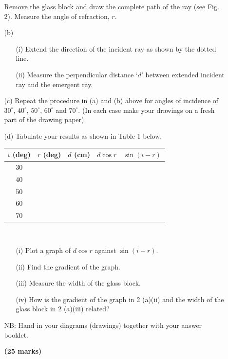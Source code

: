 \begin{enumerate}
\begin{enumerate}
Remove the glass block and draw the complete path of the ray (see Fig. 2). Measure the angle of refraction, $r$.
\item[(b)]
\begin{enumerate}
\item[(i)] Extend the direction of the incident ray as shown by the dotted line.
\item[(ii)] Measure the perpendicular distance `$d$' between extended incident ray and the emergent ray.
\end{enumerate}
\item[(c)] Repeat the procedure in (a) and (b) above for angles of incidence of $30^\circ$, $40^\circ$, $50^\circ$, $60^\circ$ and $70^\circ$. (In each case make your drawings on a fresh part of the drawing paper).
\item[(d)] Tabulate your results as shown in Table 1 below.
\begin{center}
\begin{tabular}{|p{}|p{}|p{}|p{}|p{}|} \hline
\multicolumn{1}{|c|}{$i$ (deg)} & \multicolumn{1}{c|}{$r$ (deg)} & \multicolumn{1}{c|}{$d$ (cm)} & \multicolumn{1}{c|}{$d\cos{r}$} & \multicolumn{1}{c|}{$\sin{(i-r)}$} \\ \hline
\multicolumn{1}{|c|}{30}&&&& \\
\multicolumn{1}{|c|}{40}&&&& \\
\multicolumn{1}{|c|}{50}&&&& \\
\multicolumn{1}{|c|}{60}&&&& \\
\multicolumn{1}{|c|}{70}&&&& \\ \hline
\end{tabular}\\[10pt]
\end{center}
\begin{enumerate}
\item[(i)] Plot a graph of $d\cos{r}$ against $\sin{(i-r)}$.
\item[(ii)] Find the gradient of the graph.
\item[(iii)] Measure the width of the glass block.
\item[(iv)] How is the gradient of the graph in 2 (a)(ii) and the width of the glass block in 2 (a)(iii) related?\\[5pt]
\end{enumerate}
\item[] NB: \quad Hand in your diagrams (drawings) together with your answer booklet. 
\item[] \flushright \textbf{(25 marks)}


\end{enumerate}
\end{enumerate}
